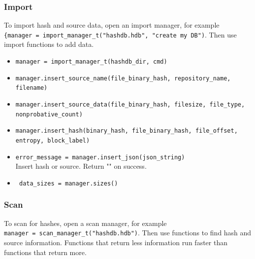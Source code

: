 \documentclass[11pt,fleqn]{article} %
\begin{document}
\subsubsection{Import}
To import hash and source data, open an import manager, for example\\
\verb+{manager = import_manager_t("hashdb.hdb", "create my DB")+. Then use import functions to add data.

\begin{itemize}
\item \verb+manager = import_manager_t(hashdb_dir, cmd)+
\item \verb+manager.insert_source_name(file_binary_hash, repository_name, filename)+
\item \verb+manager.insert_source_data(file_binary_hash, filesize, file_type,+\\
\verb+nonprobative_count)+
\item \verb+manager.insert_hash(binary_hash, file_binary_hash, file_offset,+\\
\verb+entropy, block_label)+
\item \verb+error_message = manager.insert_json(json_string)+\\
Insert hash or source. Return "" on success.
\item \verb+ data_sizes = manager.sizes()+
\end{itemize}

\subsubsection{Scan}
To scan for hashes, open a scan manager, for example\\
\verb+manager = scan_manager_t("hashdb.hdb")+. Then use functions to find hash and source information. Functions that return less information run faster than functions that return more.
\end{document}
